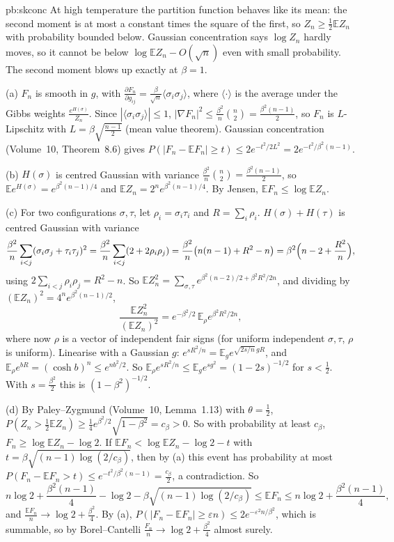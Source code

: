 \begin{solution}{pb:skconc}
\idea At high temperature the partition function behaves like its mean: the second moment is at most a constant times the square of the first, so $Z_n\ge\frac12\mathbb EZ_n$
with probability bounded below. Gaussian concentration says $\log Z_n$ hardly moves, so it cannot be below $\log\mathbb EZ_n-O(\sqrt n)$ even with small probability. The
second moment blows up exactly at $\beta=1$.

\writeup (a) $F_n$ is smooth in $g$, with $\frac{\partial F_n}{\partial g_{ij}}=\frac\beta{\sqrt n}\langle\sigma_i\sigma_j\rangle$, where $\langle\cdot\rangle$ is the average under the Gibbs
weights $\frac{e^{H(\sigma)}}{Z_n}$. Since $|\langle\sigma_i\sigma_j\rangle|\le1$, $|\nabla F_n|^2\le\frac{\beta^2}n\binom n2=\frac{\beta^2(n-1)}2$, so $F_n$ is $L$-Lipschitz with
$L=\beta\sqrt{\frac{n-1}2}$ (mean value theorem). Gaussian concentration (Volume~10, Theorem~8.6) gives $P(|F_n-\mathbb EF_n|\ge t)\le2e^{-t^2/2L^2}=2e^{-t^2/\beta^2(n-1)}$.

(b) $H(\sigma)$ is centred Gaussian with variance $\frac{\beta^2}n\binom n2=\frac{\beta^2(n-1)}2$, so $\mathbb Ee^{H(\sigma)}=e^{\beta^2(n-1)/4}$ and $\mathbb EZ_n=2^ne^{\beta^2(n-1)/4}$.
By Jensen, $\mathbb EF_n\le\log\mathbb EZ_n$.

(c) For two configurations $\sigma,\tau$, let $\rho_i=\sigma_i\tau_i$ and $R=\sum_i\rho_i$. $H(\sigma)+H(\tau)$ is centred Gaussian with variance
\[
\frac{\beta^2}n\sum_{i<j}(\sigma_i\sigma_j+\tau_i\tau_j)^2=\frac{\beta^2}n\sum_{i<j}(2+2\rho_i\rho_j)=\frac{\beta^2}n\bigl(n(n-1)+R^2-n\bigr)=\beta^2\Bigl(n-2+\frac{R^2}n\Bigr),
\]
using $2\sum_{i<j}\rho_i\rho_j=R^2-n$. So $\mathbb EZ_n^2=\sum_{\sigma,\tau}e^{\beta^2(n-2)/2+\beta^2R^2/2n}$, and dividing by $(\mathbb EZ_n)^2=4^ne^{\beta^2(n-1)/2}$,
\[
\frac{\mathbb EZ_n^2}{(\mathbb EZ_n)^2}=e^{-\beta^2/2}\,\mathbb E_\rho e^{\beta^2R^2/2n},
\]
where now $\rho$ is a vector of independent fair signs (for uniform independent $\sigma,\tau$, $\rho$ is uniform). Linearise with a Gaussian $g$: $e^{sR^2/n}=\mathbb E_ge^{\sqrt{2s/n}\,gR}$,
and $\mathbb E_\rho e^{bR}=(\cosh b)^n\le e^{nb^2/2}$. So $\mathbb E_\rho e^{sR^2/n}\le\mathbb E_ge^{sg^2}=(1-2s)^{-1/2}$ for $s<\frac12$. With $s=\frac{\beta^2}2$ this is $(1-\beta^2)^{-1/2}$.

(d) By Paley--Zygmund (Volume~10, Lemma~1.13) with $\theta=\frac12$, $P(Z_n>\frac12\mathbb EZ_n)\ge\frac14e^{\beta^2/2}\sqrt{1-\beta^2}=c_\beta>0$. So with probability at least $c_\beta$,
$F_n\ge\log\mathbb EZ_n-\log2$. If $\mathbb EF_n<\log\mathbb EZ_n-\log2-t$ with $t=\beta\sqrt{(n-1)\log(2/c_\beta)}$, then by (a) this event has probability at most
$P(F_n-\mathbb EF_n>t)\le e^{-t^2/\beta^2(n-1)}=\frac{c_\beta}2$, a contradiction. So
\[
n\log2+\frac{\beta^2(n-1)}4-\log2-\beta\sqrt{(n-1)\log(2/c_\beta)}\le\mathbb EF_n\le n\log2+\frac{\beta^2(n-1)}4,
\]
and $\frac{\mathbb EF_n}n\to\log2+\frac{\beta^2}4$. By (a), $P(|F_n-\mathbb EF_n|\ge\varepsilon n)\le2e^{-\varepsilon^2n/\beta^2}$, which is summable, so by Borel--Cantelli
$\frac{F_n}n\to\log2+\frac{\beta^2}4$ almost surely.


\end{solution}
